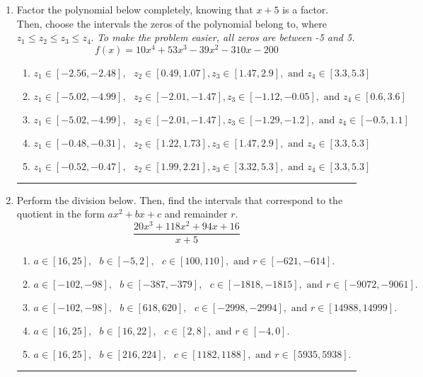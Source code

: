 \documentclass[14pt]{extbook}
\newcommand{\litem}[1]{\item#1\hspace*{-1cm}\rule{\textwidth}{0.4pt}}
\begin{document}
\begin{enumerate}
{\begin{enumerate}[label=\Alph*.]
\end{enumerate} }
\litem{
Factor the polynomial below completely, knowing that $x + 5$ is a factor. Then, choose the intervals the zeros of the polynomial belong to, where $z_1 \leq z_2 \leq z_3 \leq z_4$. \textit{To make the problem easier, all zeros are between -5 and 5.}\[ f(x) = 10x^{4} +53 x^{3} -39 x^{2} -310 x -200 \]\begin{enumerate}[label=\Alph*.]
\item \( z_1 \in [-2.56, -2.48], \text{   }  z_2 \in [0.49, 1.07], z_3 \in [1.47, 2.9], \text{   and   } z_4 \in [3.3, 5.3] \)
\item \( z_1 \in [-5.02, -4.99], \text{   }  z_2 \in [-2.01, -1.47], z_3 \in [-1.12, -0.05], \text{   and   } z_4 \in [0.6, 3.6] \)
\item \( z_1 \in [-5.02, -4.99], \text{   }  z_2 \in [-2.01, -1.47], z_3 \in [-1.29, -1.2], \text{   and   } z_4 \in [-0.5, 1.1] \)
\item \( z_1 \in [-0.48, -0.31], \text{   }  z_2 \in [1.22, 1.73], z_3 \in [1.47, 2.9], \text{   and   } z_4 \in [3.3, 5.3] \)
\item \( z_1 \in [-0.52, -0.47], \text{   }  z_2 \in [1.99, 2.21], z_3 \in [3.32, 5.3], \text{   and   } z_4 \in [3.3, 5.3] \)

\end{enumerate} }
\litem{
Perform the division below. Then, find the intervals that correspond to the quotient in the form $ax^2+bx+c$ and remainder $r$.\[ \frac{20x^{3} +118 x^{2} +94 x + 16}{x + 5} \]\begin{enumerate}[label=\Alph*.]
\item \( a \in [16, 25], \text{   } b \in [-5, 2], \text{   } c \in [100, 110], \text{   and   } r \in [-621, -614]. \)
\item \( a \in [-102, -98], \text{   } b \in [-387, -379], \text{   } c \in [-1818, -1815], \text{   and   } r \in [-9072, -9061]. \)
\item \( a \in [-102, -98], \text{   } b \in [618, 620], \text{   } c \in [-2998, -2994], \text{   and   } r \in [14988, 14999]. \)
\item \( a \in [16, 25], \text{   } b \in [16, 22], \text{   } c \in [2, 8], \text{   and   } r \in [-4, 0]. \)
\item \( a \in [16, 25], \text{   } b \in [216, 224], \text{   } c \in [1182, 1188], \text{   and   } r \in [5935, 5938]. \)


\end{enumerate}}
\end{enumerate}
\end{document}
